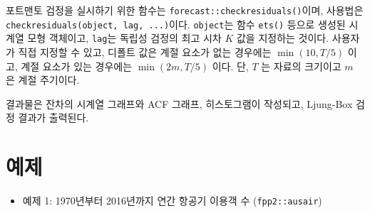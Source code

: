 \documentclass[
]{book}
\providecommand{\tightlist}{%
  \setlength{\itemsep}{0pt}\setlength{\parskip}{0pt}}
\begin{document}
포트맨토 검정을 실시하기 위한 함수는 \texttt{forecast::checkresiduals()}이며,
사용법은 \texttt{checkresiduals(object,\ lag,\ ...)}이다.
\texttt{object}는 함수 \texttt{ets()} 등으로 생성된 시계열 모형 객체이고,
\texttt{lag}는 독립성 검정의 최고 시차 \(K\) 값을 지정하는 것이다.
사용자가 직접 지정할 수 있고, 디폴트 값은 계절 요소가 없는 경우에는 \(\min(10, T/5)\) 이고,
계절 요소가 있는 경우에는 \(\min(2m, T/5)\) 이다. 단, \(T\) 는 자료의 크기이고 \(m\) 은 계절 주기이다.

결과물은 잔차의 시계열 그래프와 ACF 그래프, 히스토그램이 작성되고, Ljung-Box 검정 결과가 출력된다.

\hypertarget{uxc608uxc81c}{%
\section{예제}\label{uxc608uxc81c}}

\begin{itemize}
\tightlist
\item
  예제 1: 1970년부터 2016년까지 연간 항공기 이용객 수 (\texttt{fpp2::ausair})
\end{itemize}

  
\end{document}
